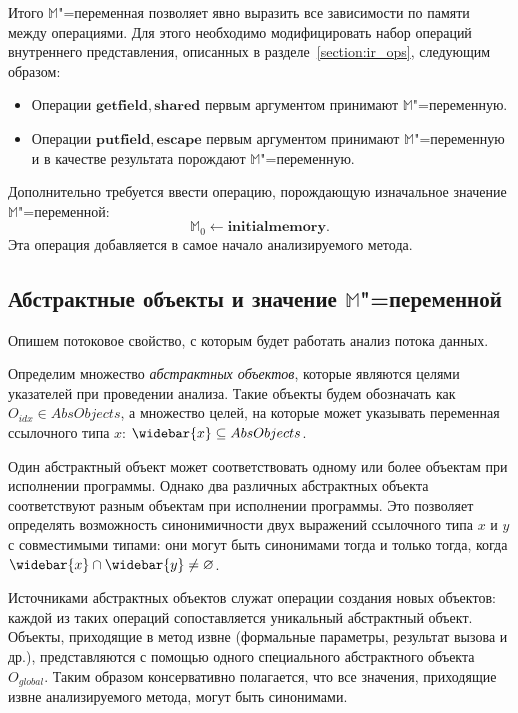 \documentclass[14pt,titlepage,draft]{extarticle}
\newcommand{\M}{\ensuremath{\mathbb{M}}}
\newcommand{\op}[1]{\mathbf{#1}}
\newcommand{\pts}[1]{\widebar{#1}}
\newcommand{\AO}{O}
\newcommand{\AOGlobal}{\AO_{global}}
\begin{document}
    Итого \M"=переменная позволяет явно выразить все зависимости по памяти
    между операциями. Для этого необходимо модифицировать набор операций
    внутреннего представления, описанных в разделе~\ref{section:ir_ops},
    следующим образом:
    \begin{itemize}
      \item Операции $\op{getfield}, \op{shared}$ первым
            аргументом принимают \M"=переменную.
      \item Операции $\op{putfield}, \op{escape}$
            первым аргументом принимают \M"=переменную и в качестве результата
            порождают \M"=переменную.
    \end{itemize}
    Дополнительно требуется ввести операцию, порождающую изначальное значение
    \M"=переменной:
    \[\M_0 \gets \op{initialmemory}.\]
    Эта операция добавляется в самое начало анализируемого метода.

  \subsection{Абстрактные объекты и значение \texorpdfstring{\M}{M}"=переменной}
    \label{section:ao_lattices}

    Опишем потоковое свойство, с которым будет работать анализ потока
    данных.

    Определим множество \emph{абстрактных объектов}, которые являются
    целями указателей при проведении анализа.
    Такие объекты будем обозначать как $\AO_{idx} \in AbsObjects$,
    а множество целей, на которые может указывать переменная ссылочного типа
    $x$: $\pts{x} \subseteq AbsObjects$.

    Один абстрактный объект может соответствовать одному или более объектам при
    исполнении программы. Однако два различных абстрактных объекта
    соответствуют разным объектам при исполнении программы.
    Это позволяет определять возможность синонимичности двух
    выражений ссылочного типа $x$ и $y$ с совместимыми типами: они могут быть
    синонимами тогда и только тогда, когда $\pts{x} \cap \pts{y} \ne
    \emptyset$.

    Источниками абстрактных объектов служат операции создания новых объектов:
    каждой из таких операций сопоставляется уникальный абстрактный объект.
    Объекты, приходящие в метод извне (формальные параметры, результат вызова и
    др.), представляются с помощью одного специального абстрактного объекта
    $\AOGlobal$. Таким образом консервативно полагается, что все значения,
    приходящие извне анализируемого метода, могут быть синонимами.
\end{document}
